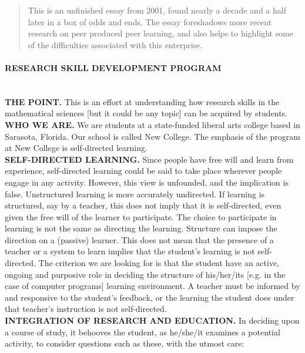 
\begin{quote}
This is an unfinished essay from 2001, found nearly a decade and a
half later in a box of odds and ends. The essay foreshadows more
recent research on peer produced peer learning, and also helps to
highlight some of the difficulties associated with this enterprise.
\end{quote}

\paragraph{RESEARCH SKILL DEVELOPMENT PROGRAM}\quad\\

\noindent \textbf{THE POINT.} This is an effort at understanding how research skills in the
mathematical sciences [but it could be any topic] can be acquired by
students. \\

\noindent \textbf{WHO WE ARE.} We are students at a state-funded liberal arts college based in
Sarasota, Florida.  Our school is called New College.  The emphasis of
the program at New College is self-directed learning. \\

\noindent \textbf{SELF-DIRECTED LEARNING.} Since people have free will and learn from experience, self-directed
learning could be said to take place wherever people engage in any
activity.  However, this view is unfounded, and the implication is
false.  Unstructured learning is more accurately undirected.  If
learning is structured, say by a teacher, this does not imply that it
is self-directed, even given the free will of the learner to
participate.  The choice to participate in learning is not the same as
directing the learning.  Structure can impose the direction on a
(passive) learner.  This does not mean that the presence of a teacher
or a system to learn implies that the student's learning is not
self-directed.  The criterion we are looking for is that the student
have an active, ongoing and purposive role in deciding the structure
of his/her/its [e.g. in the case of computer programs] learning
environment.  A teacher must be informed by and responsive to the
student's feedback, or the learning the student does under that
teacher's instruction is not self-directed. \\

\noindent \textbf{INTEGRATION OF RESEARCH AND EDUCATION.} In deciding upon a course of study, it behooves the student,
as he/she/it examines a potential activity, to consider questions such
as these, with the utmost care:

